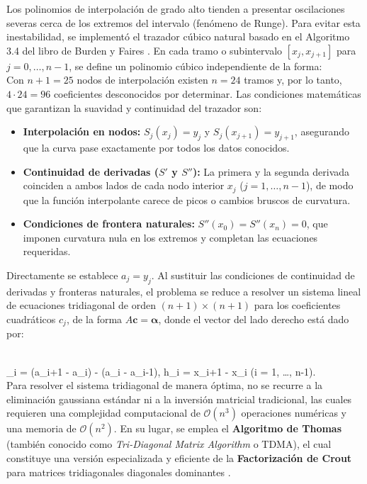 \documentclass[11pt]{article}
\begin{document}
Los polinomios de interpolación de grado alto tienden a presentar oscilaciones severas cerca de los extremos del intervalo (fenómeno de Runge). Para evitar esta inestabilidad, se implementó el trazador cúbico natural basado en el Algoritmo 3.4 del libro de Burden y Faires \cite{burden}. En cada tramo o subintervalo $[x_j, x_{j+1}]$ para $j = 0, \dots, n-1$, se define un polinomio cúbico independiente de la forma:
\\[
S_j(x) = a_j + b_j (x - x_j) + c_j (x - x_j)^2 + d_j (x - x_j)^3.
\\]
Con $n+1 = 25$ nodos de interpolación existen $n = 24$ tramos y, por lo tanto, $4 \cdot 24 = 96$ coeficientes desconocidos por determinar. Las condiciones matemáticas que garantizan la suavidad y continuidad del trazador son:
\begin{itemize}
    \item \textbf{Interpolación en nodos:} $S_j(x_j) = y_j$ y $S_j(x_{j+1}) = y_{j+1}$, asegurando que la curva pase exactamente por todos los datos conocidos.
    \item \textbf{Continuidad de derivadas ($S'$ y $S''$):} La primera y la segunda derivada coinciden a ambos lados de cada nodo interior $x_j$ ($j = 1, \dots, n-1$), de modo que la función interpolante carece de picos o cambios bruscos de curvatura.
    \item \textbf{Condiciones de frontera naturales:} $S''(x_0) = S''(x_n) = 0$, que imponen curvatura nula en los extremos y completan las ecuaciones requeridas.
\end{itemize}

Directamente se establece $a_j = y_j$. Al sustituir las condiciones de continuidad de derivadas y fronteras naturales, el problema se reduce a resolver un sistema lineal de ecuaciones tridiagonal de orden $(n+1) \times (n+1)$ para los coeficientes cuadráticos $c_j$, de la forma $A \mathbf{c} = \boldsymbol{\alpha}$, donde el vector del lado derecho está dado por:

\\

\alpha_i = (a_{i+1} - a_i) - (a_i - a_{i-1}), \qquad h_i = x_{i+1} - x_i \quad (i = 1, \dots, n-1).
\\

Para resolver el sistema tridiagonal de manera óptima, no se recurre a la eliminación gaussiana estándar ni a la inversión matricial tradicional, las cuales requieren una complejidad computacional de $\mathcal{O}(n^3)$ operaciones numéricas y una memoria de $\mathcal{O}(n^2)$. En su lugar, se emplea el \textbf{Algoritmo de Thomas} (también conocido como \textit{Tri-Diagonal Matrix Algorithm} o TDMA), el cual constituye una versión especializada y eficiente de la \textbf{Factorización de Crout} para matrices tridiagonales diagonales dominantes \cite{burden, thomas1949}.
\end{document}
